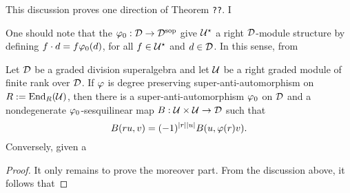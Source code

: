 \documentclass{amsbook}
\begin{document}
This discussion proves one direction of Theorem {\tt ??}. I

One should note that the $\varphi_0: \mathcal{D} \to \mathcal{D}^{\mathrm{sop}}$ give $\mathcal U^\star$ a right $\mathcal{D}$-module structure by defining $f\cdot d = f\varphi_0(d)$, for all $f\in \mathcal U^\star$ and $d\in \mathcal{D}$. In this sense, from


\begin{thm}
    Let $\mathcal{D}$ be a graded division superalgebra and let $\mathcal U$ be a right graded module of finite rank over $\mathcal{D}$. If $\varphi$ is degree preserving super-anti-automorphism on $R := \operatorname{End}_R(\mathcal U)$, then there is a super-anti-automorphism $\varphi_0$ on $\mathcal{D}$ and a nondegenerate $\varphi_0$-sesquilinear map $B: \mathcal U \times \mathcal U \to \mathcal{D}$ such that
    \[
        B(ru,v) = (-1)^{|r||u|} B(u,\varphi(r)v).
    \]
    Conversely, given a $ $
\end{thm}

\begin{proof}
    It only remains to prove the moreover part. From the discussion above, it follows that 
\end{proof}






\end{document}
